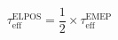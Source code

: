 \documentclass[a5paper]{article}
\begin{document}
\LARGE
\pagestyle{empty}
\[
\tau_\mathrm{eff}^\mathrm{ELPOS} = \frac{1}{2} \times \tau_\mathrm{eff}^\mathrm{EMEP}
\]
\end{document}

